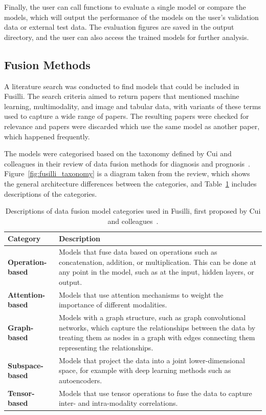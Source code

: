 Finally, the user can call functions to evaluate a single model or compare the models, which will output the performance of the models on the user's validation data or external test data.
The evaluation figures are saved in the output directory, and the user can also access the trained models for further analysis.

\subsection{Fusion Methods}

A literature search was conducted to find models that could be included in Fusilli.
The search criteria aimed to return papers that mentioned machine learning, multimodality, and image and tabular data, with variants of these terms used to capture a wide range of papers.
The resulting papers were checked for relevance and papers were discarded which use the same model as another paper, which happened frequently.

The models were categorised based on the taxonomy defined by Cui and colleagues in their review of data fusion methods for diagnosis and prognosis~\cite{cuiDeepMultimodalFusion2022}.
Figure~\ref{fig:fusilli_taxonomy} is a diagram taken from the review, which shows the general architecture differences between the categories, and Table~\ref{tab:fusilli_taxonomy} includes descriptions of the categories.

\begin{table}
    \centering
    \caption[Descriptions of data fusion model categories used in Fusilli.]{Descriptions of data fusion model categories used in Fusilli, first proposed by Cui and colleagues~\cite{cuiDeepMultimodalFusion2022}.}
    \label{tab:fusilli_taxonomy}
    \begin{tabular}{|p{}p{}|}
        \hline
        \textbf{Category} & \textbf{Description} \\ \hline
        \textbf{Operation-based} & Models that fuse data based on operations such as concatenation, addition, or multiplication. This can be done at any point in the model, such as at the input, hidden layers, or output. \\ \hline
        \textbf{Attention-based} & Models that use attention mechanisms to weight the importance of different modalities. \\ \hline
        \textbf{Graph-based} & Models with a graph structure, such as graph convolutional networks, which capture the relationships between the data by treating them as nodes in a graph with edges connecting them representing the relationships. \\ \hline
        \textbf{Subspace-based} & Models that project the data into a joint lower-dimensional space, for example with deep learning methods such as autoencoders. \\ \hline
        \textbf{Tensor-based} & Models that use tensor operations to fuse the data to capture inter- and intra-modality correlations. \\ \hline
    \end{tabular}
\end{table}

